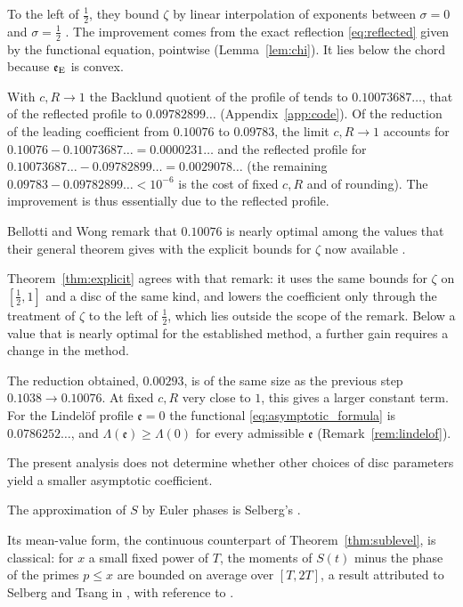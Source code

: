 \documentclass[11pt,a4paper]{article}
\makeatletter
\numberwithin{equation}{section}
\DeclareRobustCommand{\CGref}[1]{\ref{#1}}
\DeclareRobustCommand{\CGeqref}[1]{\eqref{#1}}
\DeclareRobustCommand{\CGcite}[2][]{\if\relax\detokenize{#1}\relax\cite{#2}\else\cite[#1]{#2}\fi}
\let\CG@origref\ref
\let\CG@origeqref\eqref
\newcommand{\CG@gettip}[1]{\@ifundefined{CGTip@#1}{#1}{\csname CGTip@#1\endcsname}}
\newcommand{\CG@getbib}[1]{\@ifundefined{CGBib@#1}{#1}{\csname CGBib@#1\endcsname}}
\DeclareRobustCommand{\CGref}[1]{\pdftooltip{\CG@origref{#1}}{\CG@gettip{#1}}}
\DeclareRobustCommand{\CGeqref}[1]{\pdftooltip{\CG@origeqref{#1}}{\CG@gettip{#1}}}
\DeclareRobustCommand{\CGcite}[2][]{\pdftooltip{\if\relax\detokenize{#1}\relax\cite{#2}\else\cite[#1]{#2}\fi}{\CG@getbib{#2}}}
\theoremstyle{definition}
\theoremstyle{remark}
\newcommand{\eE}{\mathfrak e_{\rm E}}
\makeatother
\begin{document}
To the left of $\frac12$, they bound $\zeta$ by linear interpolation of exponents between $\sigma=0$ and $\sigma=\frac12$ \CGcite[\S3.1]{BellottiWong2025}. The improvement comes from the exact reflection \CGeqref{eq:reflected} given by the functional equation, pointwise (Lemma~\CGref{lem:chi}). It lies below the chord because $\eE$ is convex.

\par
With $c,R\to1$ the Backlund quotient of the profile of \CGcite{BellottiWong2025} tends to $0.10073687\ldots$, that of the reflected profile to $0.09782899\ldots$ (Appendix~\CGref{app:code}). Of the reduction of the leading coefficient from $0.10076$ to $0.09783$, the limit $c,R\to1$ accounts for $0.10076-0.10073687\ldots=0.0000231\ldots$ and the reflected profile for $0.10073687\ldots-0.09782899\ldots=0.0029078\ldots$ (the remaining $0.09783-0.09782899\ldots<10^{-6}$ is the cost of fixed $c,R$ and of rounding). The improvement is thus essentially due to the reflected profile.

Bellotti and Wong remark that $0.10076$ is nearly optimal among the values that their general theorem gives with the explicit bounds for $\zeta$ now available \CGcite[\S1]{BellottiWong2025}.

Theorem~\CGref{thm:explicit} agrees with that remark: it uses the same bounds for $\zeta$ on $[\frac12,1]$ and a disc of the same kind, and lowers the coefficient only through the treatment of $\zeta$ to the left of $\frac12$, which lies outside the scope of the remark. Below a value that is nearly optimal for the established method, a further gain requires a change in the method.

The reduction obtained, $0.00293$, is of the same size as the previous step $0.1038\to0.10076$. At fixed $c,R$ very close to $1$, this gives a larger constant term. For the Lindel\"of profile $\mathfrak e=0$ the functional \CGeqref{eq:asymptotic_formula} is $0.0786252\ldots$, and $\Lambda(\mathfrak e)\ge\Lambda(0)$ for every admissible $\mathfrak e$ (Remark~\CGref{rem:lindelof}).

The present analysis does not determine whether other choices of disc parameters yield a smaller asymptotic coefficient.

The approximation of $S$ by Euler phases is Selberg's \CGcite{Selberg1946a}.

Its mean-value form, the continuous counterpart of Theorem~\CGref{thm:sublevel}, is classical: for $x$ a small fixed power of $T$, the moments of $S(t)$ minus the phase of the primes $p\le x$ are bounded on average over $[T,2T]$, a result attributed to Selberg and Tsang in \CGcite[\S3, before (3.6)]{FazzariGerspachMinelli2025}, with reference to \CGcite[Thm.~5.1]{Tsang1984}.
\end{document}
